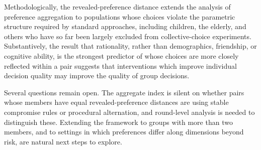 \documentclass[11 pt]{article}
\begin{document}
Methodologically, the revealed-preference distance extends the analysis of preference aggregation to populations whose choices violate the parametric structure required by standard approaches, including children, the elderly, and others who have so far been largely excluded from collective-choice experiments. Substantively, the result that rationality, rather than demographics, friendship, or cognitive ability, is the strongest predictor of whose choices are more closely reflected within a pair suggests that interventions which improve individual decision quality may improve the quality of group decisions.

Several questions remain open. The aggregate index is silent on whether pairs whose members have equal revealed-preference distances are using stable compromise rules or procedural alternation, and round-level analysis is needed to distinguish these. Extending the framework to groups with more than two members, and to settings in which preferences differ along dimensions beyond risk, are natural next steps to explore.


\newpage

\printbibliography


\clearpage

\appendix
{}

\doublespacing

\renewcommand{\theequation}{\thesection.\arabic{equation}}


\setcounter{figure}{0}
\renewcommand{\thefigure}{A\arabic{figure}}

\setcounter{table}{0}
\renewcommand{\thetable}{A\arabic{table}}

\setcounter{theorem}{0}
\renewcommand{\thetheorem}{A\arabic{theorem}}

\setcounter{proposition}{0}
\renewcommand{\theproposition}{A\arabic{proposition}}

\setcounter{lemma}{0}
\renewcommand{\thelemma}{A\arabic{lemma}}

\end{document}
